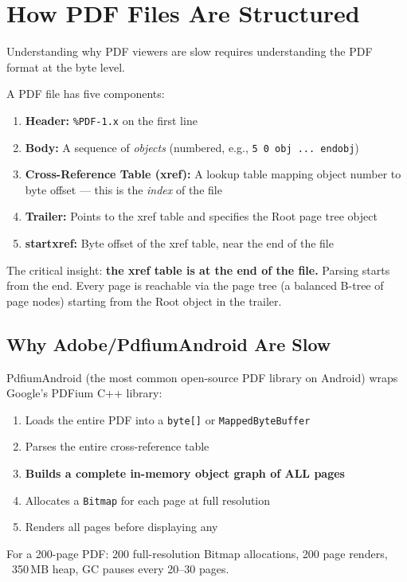 \documentclass[11pt, a4paper, openright]{report}
\begin{document}
\section{How PDF Files Are Structured}

Understanding why PDF viewers are slow requires understanding the PDF format at the byte level.

A PDF file has five components:
\begin{enumerate}
  \item \textbf{Header:} \texttt{\%PDF-1.x} on the first line
  \item \textbf{Body:} A sequence of \textit{objects} (numbered, e.g., \texttt{5 0 obj ... endobj})
  \item \textbf{Cross-Reference Table (xref):} A lookup table mapping object number to byte offset --- this is the \textit{index} of the file
  \item \textbf{Trailer:} Points to the xref table and specifies the Root page tree object
  \item \textbf{startxref:} Byte offset of the xref table, near the end of the file
\end{enumerate}

The critical insight: \textbf{the xref table is at the end of the file.} Parsing starts from the end. Every page is reachable via the page tree (a balanced B-tree of page nodes) starting from the Root object in the trailer.

\subsection{Why Adobe/PdfiumAndroid Are Slow}

PdfiumAndroid (the most common open-source PDF library on Android) wraps Google's PDFium C++ library:

\begin{enumerate}
  \item Loads the entire PDF into a \texttt{byte[]} or \texttt{MappedByteBuffer}
  \item Parses the entire cross-reference table
  \item \textbf{Builds a complete in-memory object graph of ALL pages}
  \item Allocates a \texttt{Bitmap} for each page at full resolution
  \item Renders all pages before displaying any
\end{enumerate}

For a 200-page PDF: 200 full-resolution Bitmap allocations, 200 page renders, ~350\,MB heap, GC pauses every 20--30 pages.
\end{document}
